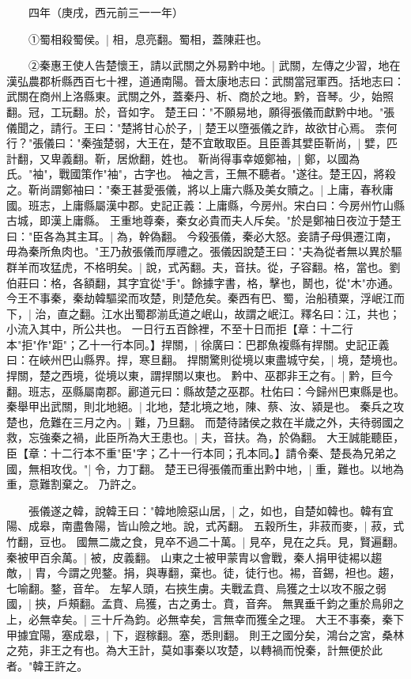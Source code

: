 　　四年（庚戌，西元前三一一年）

　　①蜀相殺蜀侯。|{
	相，息亮翻。蜀相，蓋陳莊也。
	}

　　②秦惠王使人告楚懷王，請以武關之外易黔中地。|{
	武關，左傳之少習，地在漢弘農郡析縣西百七十裡，道通南陽。晉太康地志曰：武關當冠軍西。括地志曰：武關在商州上洛縣東。武關之外，蓋秦丹、析、商於之地。黔，音琴。少，始照翻。冠，工玩翻。於，音如字。
	}
楚王曰："不願易地，願得張儀而獻黔中地。"張儀聞之，請行。王曰："楚將甘心於子，|{
	楚王以墮張儀之詐，故欲甘心焉。
	}
柰何行？"張儀曰："秦強楚弱，大王在，楚不宜敢取臣。且臣善其嬖臣靳尚，|{
	嬖，匹計翻，又卑義翻。靳，居焮翻，姓也。
	}
靳尚得事幸姬鄭袖，|{
	鄭，以國為氏。"袖"，戰國策作"袖"，古字也。
	}
袖之言，王無不聽者。"遂往。楚王囚，將殺之。靳尚謂鄭袖曰："秦王甚愛張儀，將以上庸六縣及美女贖之。|{
	上庸，春秋庸國。班志，上庸縣屬漢中郡。史記正義：上庸縣，今房州。宋白曰：今房州竹山縣古城，即漢上庸縣。
	}
王重地尊秦，秦女必貴而夫人斥矣。"於是鄭袖日夜泣于楚王曰："臣各為其主耳。|{
	為，幹偽翻。
	}
今殺張儀，秦必大怒。妾請子母俱遷江南，毋為秦所魚肉也。"王乃赦張儀而厚禮之。張儀因說楚王曰："夫為從者無以異於驅群羊而攻猛虎，不格明矣。|{
	說，式芮翻。夫，音扶。從，子容翻。格，當也。劉伯莊曰：格，各額翻，其字宜從"手"。餘據字書，格，擊也，鬭也，從"木"亦通。
	}
今王不事秦，秦劫韓驅梁而攻楚，則楚危矣。秦西有巴、蜀，治船積粟，浮岷江而下，|{
	治，直之翻。江水出蜀郡湔氐道之岷山，故謂之岷江。釋名曰：江，共也；小流入其中，所公共也。
	}
一日行五百餘裡，不至十日而拒【章：十二行本"拒"作"距"；乙十一行本同。】捍關，|{
	徐廣曰：巴郡魚複縣有捍關。史記正義曰：在峽州巴山縣界。捍，寒旦翻。
	}
捍關驚則從境以東盡城守矣，|{
	境，楚境也。捍關，楚之西境，從境以東，謂捍關以東也。
	}
黔中、巫郡非王之有。|{
	黔，巨今翻。班志，巫縣屬南郡。酈道元曰：縣故楚之巫郡。杜佑曰：今歸州巴東縣是也。
	}
秦舉甲出武關，則北地絕。|{
	北地，楚北境之地，陳、蔡、汝、潁是也。
	}
秦兵之攻楚也，危難在三月之內。|{
	難，乃旦翻。
	}
而楚待諸侯之救在半歲之外，夫待弱國之救，忘強秦之禍，此臣所為大王患也。|{
	夫，音扶。為，於偽翻。
	}
大王誠能聽臣，臣【章：十二行本不重"臣"字；乙十一行本同；孔本同。】請令秦、楚長為兄弟之國，無相攻伐。"|{
	令，力丁翻。
	}
楚王已得張儀而重出黔中地，|{
	重，難也。以地為重，意難割棄之。
	}
乃許之。

　　張儀遂之韓，說韓王曰："韓地險惡山居，|{
	之，如也，自楚如韓也。韓有宜陽、成皋，南盡魯陽，皆山險之地。說，式芮翻。
	}
五穀所生，非菽而麥，|{
	菽，式竹翻，豆也。
	}
國無二歲之食，見卒不過二十萬。|{
	見卒，見在之兵。見，賢遍翻。
	}
秦被甲百余萬。|{
	被，皮義翻。
	}
山東之士被甲蒙胄以會戰，秦人捐甲徒裼以趨敵，|{
	胄，今謂之兜鍪。捐，與專翻，棄也。徒，徒行也。裼，音錫，袒也。趨，七喻翻。鍪，音牟。
	}
左挈人頭，右挾生虜。夫戰孟賁、烏獲之士以攻不服之弱國，|{
	挾，戶頰翻。孟賁、烏獲，古之勇士。賁，音奔。
	}
無異垂千鈞之重於鳥卵之上，必無幸矣。|{
	三十斤為鈞。必無幸矣，言無幸而獲全之理。
	}
大王不事秦，秦下甲據宜陽，塞成皋，|{
	下，遐稼翻。塞，悉則翻。
	}
則王之國分矣，鴻台之宮，桑林之苑，非王之有也。為大王計，莫如事秦以攻楚，以轉禍而悅秦，計無便於此者。"韓王許之。

